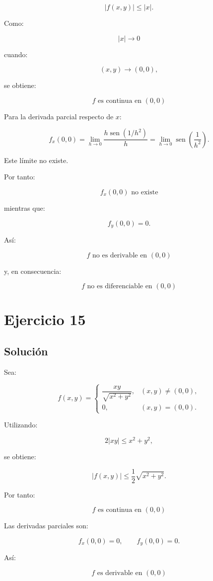 \documentclass[11pt,a4paper]{article}
\newcommand{\sen}{\operatorname{sen}}
\begin{document}
\[
|f(x,y)|
\leq
|x|.
\]

Como:

\[
|x|\to0
\]

cuando:

\[
(x,y)\to(0,0),
\]

se obtiene:

\[
\boxed{
f\text{ es continua en }(0,0)
}
\]

Para la derivada parcial respecto de \(x\):

\[
f_x(0,0)
=
\lim_{h\to0}
\frac{h\sen(1/h^2)}{h}
=
\lim_{h\to0}
\sen\left(\frac1{h^2}\right).
\]

Este límite no existe.

Por tanto:

\[
\boxed{
f_x(0,0)\text{ no existe}
}
\]

mientras que:

\[
f_y(0,0)=0.
\]

Así:

\[
\boxed{
f\text{ no es derivable en }(0,0)
}
\]

y, en consecuencia:

\[
\boxed{
f\text{ no es diferenciable en }(0,0)
}
\]

\section{Ejercicio 15}
\subsection{Solución}

Sea:

\[
f(x,y)
=
\begin{cases}
\dfrac{xy}{\sqrt{x^2+y^2}},
&
(x,y)\neq(0,0),\\[2mm]
0,
&
(x,y)=(0,0).
\end{cases}
\]

Utilizando:

\[
2|xy|
\leq
x^2+y^2,
\]

se obtiene:

\[
|f(x,y)|
\leq
\frac12\sqrt{x^2+y^2}.
\]

Por tanto:

\[
\boxed{
f\text{ es continua en }(0,0)
}
\]

Las derivadas parciales son:

\[
f_x(0,0)=0,
\qquad
f_y(0,0)=0.
\]

Así:

\[
\boxed{
f\text{ es derivable en }(0,0)
}
\]
\end{document}
